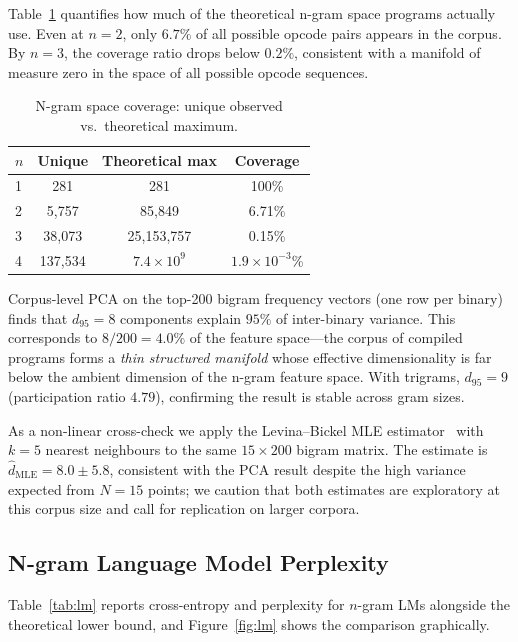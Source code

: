 \documentclass[10pt,twocolumn]{article}
\begin{document}
Table~\ref{tab:coverage} quantifies how much of the theoretical n-gram space
programs actually use.  Even at $n=2$, only $6.7\%$ of all possible opcode
pairs appears in the corpus.  By $n=3$, the coverage ratio drops below
$0.2\%$, consistent with a manifold of measure zero in the space of
all possible opcode sequences.

\begin{table}[h]
\centering
\caption{N-gram space coverage: unique observed vs.\ theoretical maximum.}
\label{tab:coverage}
\begin{tabular}{@{}lccc@{}}
\toprule
$n$ & \textbf{Unique} & \textbf{Theoretical max} & \textbf{Coverage} \\
\midrule
1 & 281       & 281             & 100\%       \\
2 & 5,757     & 85,849          & 6.71\%      \\
3 & 38,073    & 25,153,757      & 0.15\%      \\
4 & 137,534   & $7.4\times10^9$ & $1.9\times10^{-3}$\% \\
\bottomrule
\end{tabular}
\end{table}

Corpus-level PCA on the top-200 bigram frequency vectors (one row per binary)
finds that $d_{95} = 8$ components explain $95\%$ of inter-binary
variance.  This corresponds to $8/200 = 4.0\%$ of the feature
space---the corpus of compiled programs forms a \emph{thin structured
manifold} whose effective dimensionality is far below the ambient dimension of
the n-gram feature space.  With trigrams, $d_{95} = 9$ (participation
ratio $4.79$), confirming the result is stable across gram sizes.

As a non-linear cross-check we apply the Levina--Bickel MLE
estimator~\cite{levina2005mle} with $k=5$ nearest neighbours to the same
$15 \times 200$ bigram matrix.  The estimate is $\hat{d}_{\mathrm{MLE}} =
8.0 \pm 5.8$, consistent with the PCA result despite the high variance
expected from $N=15$ points; we caution that both estimates are exploratory at
this corpus size and call for replication on larger corpora.

\subsection{N-gram Language Model Perplexity}
\label{sec:lm_results}

Table~\ref{tab:lm} reports cross-entropy and perplexity for $n$-gram LMs
alongside the theoretical lower bound, and Figure~\ref{fig:lm} shows the
comparison graphically.
\end{document}
